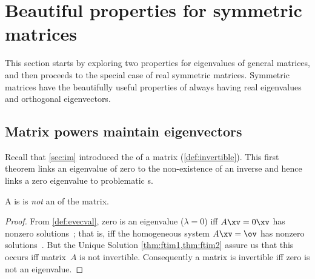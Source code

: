 

\section{Beautiful properties for symmetric matrices}
\label{sec:sm}
\secttoc

\begin{comment}
\pooliv{\S5.4} \layiv{\S7.1} \holti{\S8.3} \cite[\S10]{Davis99a}
\end{comment}



This section starts by exploring two properties for eigenvalues of general matrices, and then proceeds to the special case of real symmetric  matrices.
Symmetric matrices have the beautifully useful properties of always having real eigenvalues and orthogonal eigenvectors.



\subsection{Matrix powers maintain eigenvectors}
\label{sec:mpmev}

Recall that \autoref{sec:im} introduced the  of a matrix (\autoref{def:invertible}).
This first theorem links an eigenvalue of zero to the non-existence of an inverse and hence links a zero eigenvalue to problematic s.


\begin{theorem} \label{thm:evalinv} 
A  is    is \emph{not} an  of the matrix.
\end{theorem}
\begin{proof} 
From \autoref{def:evecval}, zero is an eigenvalue (\(\lambda=0\)) iff \(A\xv=0\xv\) has nonzero solutions~\xv; that is, iff the homogeneous system \(A\xv=\ov\) has nonzero solutions~\xv.
But the Unique Solution \cref{thm:ftim1,thm:ftim2} assure us that this occurs iff matrix~\(A\) is not invertible.
Consequently a matrix is invertible iff zero is not an eigenvalue.
\end{proof}

